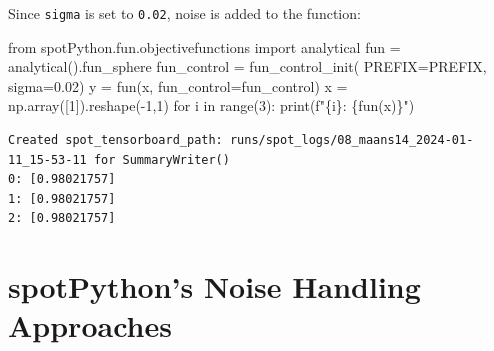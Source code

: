 \documentclass[
  letterpaper,
  DIV=11,
  numbers=noendperiod]{scrreprt}
\newenvironment{Shaded}{\begin{snugshade}}{\end{snugshade}}
\newcommand{\BuiltInTok}[1]{\textcolor[rgb]{0.00,0.23,0.31}{#1}}
\newcommand{\ControlFlowTok}[1]{\textcolor[rgb]{0.00,0.23,0.31}{#1}}
\newcommand{\DecValTok}[1]{\textcolor[rgb]{0.68,0.00,0.00}{#1}}
\newcommand{\FloatTok}[1]{\textcolor[rgb]{0.68,0.00,0.00}{#1}}
\newcommand{\ImportTok}[1]{\textcolor[rgb]{0.00,0.46,0.62}{#1}}
\newcommand{\KeywordTok}[1]{\textcolor[rgb]{0.00,0.23,0.31}{#1}}
\newcommand{\NormalTok}[1]{\textcolor[rgb]{0.00,0.23,0.31}{#1}}
\newcommand{\OperatorTok}[1]{\textcolor[rgb]{0.37,0.37,0.37}{#1}}
\newcommand{\SpecialCharTok}[1]{\textcolor[rgb]{0.37,0.37,0.37}{#1}}
\newcommand{\SpecialStringTok}[1]{\textcolor[rgb]{0.13,0.47,0.30}{#1}}
\begin{document}
\begin{tcolorbox}[enhanced jigsaw, left=2mm, opacitybacktitle=0.6, leftrule=.75mm, toptitle=1mm, opacityback=0, colback=white, rightrule=.15mm, colframe=quarto-callout-note-color-frame, title=\textcolor{quarto-callout-note-color}{\faInfo}\hspace{0.5em}{Example: The same noise added to the sphere function}, toprule=.15mm, coltitle=black, bottomrule=.15mm, bottomtitle=1mm, colbacktitle=quarto-callout-note-color!10!white, titlerule=0mm, breakable, arc=.35mm]

Since \texttt{sigma} is set to \texttt{0.02}, noise is added to the
function:

\begin{Shaded}
\begin{Highlighting}[]
\ImportTok{from}\NormalTok{ spotPython.fun.objectivefunctions }\ImportTok{import}\NormalTok{ analytical}
\NormalTok{fun }\OperatorTok{=}\NormalTok{ analytical().fun\_sphere}
\NormalTok{fun\_control }\OperatorTok{=}\NormalTok{ fun\_control\_init(}
\NormalTok{    PREFIX}\OperatorTok{=}\NormalTok{PREFIX,}
\NormalTok{    sigma}\OperatorTok{=}\FloatTok{0.02}\NormalTok{)}
\NormalTok{y }\OperatorTok{=}\NormalTok{ fun(x, fun\_control}\OperatorTok{=}\NormalTok{fun\_control)}
\NormalTok{x }\OperatorTok{=}\NormalTok{ np.array([}\DecValTok{1}\NormalTok{]).reshape(}\OperatorTok{{-}}\DecValTok{1}\NormalTok{,}\DecValTok{1}\NormalTok{)}
\ControlFlowTok{for}\NormalTok{ i }\KeywordTok{in} \BuiltInTok{range}\NormalTok{(}\DecValTok{3}\NormalTok{):}
    \BuiltInTok{print}\NormalTok{(}\SpecialStringTok{f"}\SpecialCharTok{\{}\NormalTok{i}\SpecialCharTok{\}}\SpecialStringTok{: }\SpecialCharTok{\{}\NormalTok{fun(x)}\SpecialCharTok{\}}\SpecialStringTok{"}\NormalTok{)}
\end{Highlighting}
\end{Shaded}

\begin{verbatim}
Created spot_tensorboard_path: runs/spot_logs/08_maans14_2024-01-11_15-53-11 for SummaryWriter()
0: [0.98021757]
1: [0.98021757]
2: [0.98021757]
\end{verbatim}

\end{tcolorbox}

\section{spotPython's Noise Handling
Approaches}\label{spotpythons-noise-handling-approaches}
\end{document}
